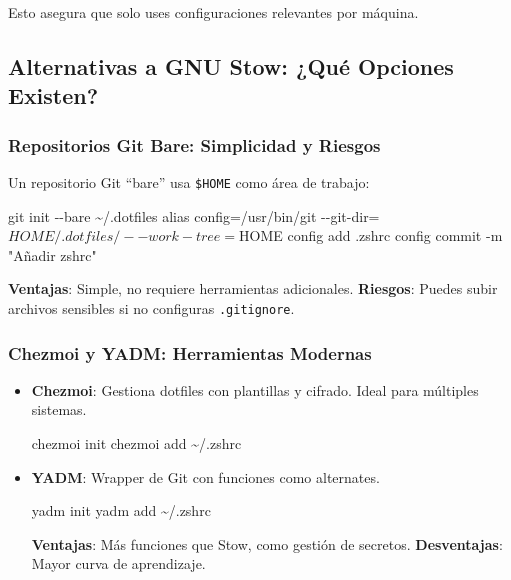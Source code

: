 \documentclass[
  jou,
  floatsintext,
  longtable,
  a4paper,
  nolmodern,
  notxfonts,
  notimes,
  colorlinks=true,linkcolor=blue,citecolor=blue,urlcolor=blue]{apa7}
\newenvironment{Shaded}{\begin{snugshade}}{\end{snugshade}}
\newcommand{\AttributeTok}[1]{\textcolor[rgb]{0.40,0.45,0.13}{#1}}
\newcommand{\BuiltInTok}[1]{\textcolor[rgb]{0.00,0.23,0.31}{#1}}
\newcommand{\ExtensionTok}[1]{\textcolor[rgb]{0.00,0.23,0.31}{#1}}
\newcommand{\FunctionTok}[1]{\textcolor[rgb]{0.28,0.35,0.67}{#1}}
\newcommand{\NormalTok}[1]{\textcolor[rgb]{0.00,0.23,0.31}{#1}}
\newcommand{\StringTok}[1]{\textcolor[rgb]{0.13,0.47,0.30}{#1}}
\begin{document}
Esto asegura que solo uses configuraciones relevantes por máquina.

\subsection{Alternativas a GNU Stow: ¿Qué Opciones
Existen?}\label{alternativas-a-gnu-stow-quuxe9-opciones-existen}

\subsubsection{Repositorios Git Bare: Simplicidad y
Riesgos}\label{repositorios-git-bare-simplicidad-y-riesgos}

Un repositorio Git ``bare'' usa \texttt{\$HOME} como área de trabajo:

\begin{Shaded}
\begin{Highlighting}[]
\FunctionTok{git}\NormalTok{ init }\AttributeTok{{-}{-}bare}\NormalTok{ \textasciitilde{}/.dotfiles}
\BuiltInTok{alias}\NormalTok{ config=}\StringTok{\textquotesingle{}/usr/bin/git {-}{-}git{-}dir=$HOME/.dotfiles/ {-}{-}work{-}tree=$HOME\textquotesingle{}}
\ExtensionTok{config}\NormalTok{ add .zshrc}
\ExtensionTok{config}\NormalTok{ commit }\AttributeTok{{-}m} \StringTok{"Añadir zshrc"}
\end{Highlighting}
\end{Shaded}

\textbf{Ventajas}: Simple, no requiere herramientas adicionales.
\textbf{Riesgos}: Puedes subir archivos sensibles si no configuras
\texttt{.gitignore}.

\subsubsection{Chezmoi y YADM: Herramientas
Modernas}\label{chezmoi-y-yadm-herramientas-modernas}

\begin{itemize}
\item
  \textbf{Chezmoi}: Gestiona dotfiles con plantillas y cifrado. Ideal
  para múltiples sistemas.

\begin{Shaded}
\begin{Highlighting}[]
\ExtensionTok{chezmoi}\NormalTok{ init}
\ExtensionTok{chezmoi}\NormalTok{ add \textasciitilde{}/.zshrc}
\end{Highlighting}
\end{Shaded}
\item
  \textbf{YADM}: Wrapper de Git con funciones como alternates.

\begin{Shaded}
\begin{Highlighting}[]
\ExtensionTok{yadm}\NormalTok{ init}
\ExtensionTok{yadm}\NormalTok{ add \textasciitilde{}/.zshrc}
\end{Highlighting}
\end{Shaded}

  \textbf{Ventajas}: Más funciones que Stow, como gestión de secretos.
  \textbf{Desventajas}: Mayor curva de aprendizaje.
\end{itemize}
\end{document}

